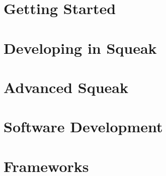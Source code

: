 \documentclass[a4paper,10pt,twoside]{book}
\begin{document}
\vfill
%
\tableofcontents
\sloppy %


\mainmatter
\part{Getting Started}




\part{Developing in Squeak}







\part{Advanced Squeak}


\part{Software Development}

%
%
%

\part{Frameworks}

%


\end{document}
